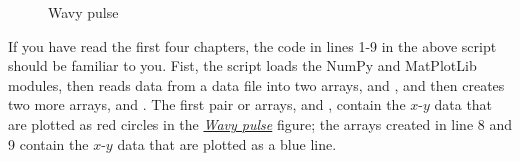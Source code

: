 \documentclass[letterpaper,10pt,english]{sphinxmanual}
\begin{document}
\begin{figure}[htbp]
\centering
\capstart

\caption{Wavy pulse}\label{chap5/chap5_plot:fig-wavypulse}\end{figure}

If you have read the first four chapters, the code in lines 1-9 in the above script should  be familiar to you.  Fist, the script loads the NumPy and MatPlotLib modules, then reads data from a data file into two arrays,  and , and then creates two more arrays,  and .  The first pair or arrays,  and , contain the \(x\)-\(y\) data that are plotted as red circles in the {\hyperref[chap5/chap5_plot:fig-wavypulse]{\emph{Wavy pulse}}} figure; the arrays created in line 8 and 9 contain the \(x\)-\(y\) data that are plotted as a blue line.
\end{document}
